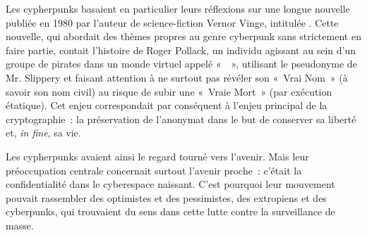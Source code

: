 Les cypherpunks basaient en particulier leurs réflexions sur une longue nouvelle publiée en 1980 par l'auteur de science-fiction Vernor Vinge, intitulée . Cette nouvelle, qui abordait des thèmes propres au genre cyberpunk sans strictement en faire partie, contait l'histoire de Roger Pollack, un individu agissant au sein d'un groupe de pirates dans un monde virtuel appelé «~~», utilisant le pseudonyme de Mr. Slippery et faisant attention à ne surtout pas révéler son «~Vrai Nom~» (à savoir son nom civil) au risque de subir une «~Vraie Mort~» (par exécution étatique). Cet enjeu correspondait par conséquent à l'enjeu principal de la cryptographie~: la préservation de l'anonymat dans le but de conserver sa liberté et, \emph{in fine}, sa vie. %

Les cypherpunks avaient ainsi le regard tourné vers l'avenir. Mais leur préoccupation centrale concernait surtout l'avenir proche~: c'était la confidentialité dans le cyberespace naissant. C'est pourquoi leur mouvement pouvait rassembler des optimistes et des pessimistes, des extropiens et des cyberpunks, qui trouvaient du sens dans cette lutte contre la surveillance de masse.

